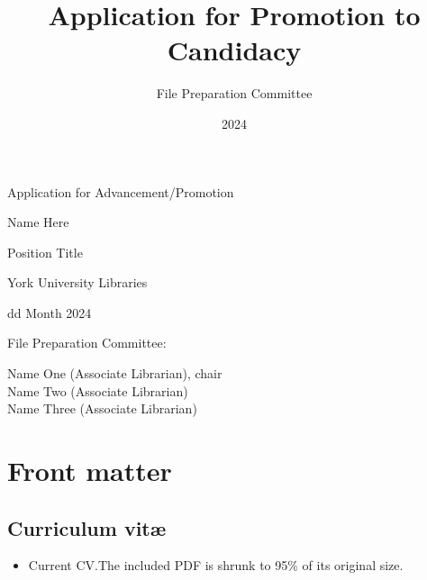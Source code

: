\documentclass[12pt,oneside]{book}
\title{Application for Promotion to Candidacy}
\author{File Preparation Committee}
\date{2024}
\begin{document}
\frontmatter

\begin{titlepage}

  \null\vfill

  \begin{center}

    {\Huge
      Application for Advancement/Promotion
    }
    \vspace{2cm}

    {\Large
      Name Here
    }
    \vspace{1cm}

  {\large
    Position Title

    York University Libraries

    \vspace{1cm}

    dd Month 2024

  }

\end{center}

\vfill
\vfill

{\large
  File Preparation Committee:

  Name One (Associate Librarian), chair \\
  \indent Name Two (Associate Librarian) \\
  \indent Name Three (Associate Librarian)
}

\hfill

\end{titlepage}



\tableofcontents

\markboth{}{}

\mainmatter{}

\chapter{Front matter}


\section{Curriculum vit\ae}

\begin{itemize}
  \item Current CV.\@  The included PDF is shrunk to 95\% of its original size.
\end{itemize}
\end{document}
